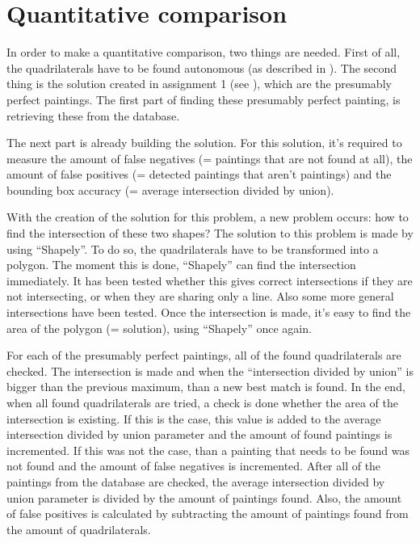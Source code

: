 

\section{Quantitative comparison}
In order to make a quantitative comparison, two things are needed. First of all, the quadrilaterals have to be found autonomous (as described in ). The second thing is the solution created in assignment 1 (see ), which are the presumably perfect paintings. The first part of finding these presumably perfect painting, is retrieving these from the database.

The next part is already building the solution. For this solution, it's required to measure the amount of false negatives (= paintings that are not found at all), the amount of false positives (= detected paintings that aren't paintings) and the bounding box accuracy (= average intersection divided by union).

With the creation of the solution for this problem, a new problem occurs: how to find the intersection of these two shapes? The solution to this problem is made by using ``Shapely''. To do so, the quadrilaterals have to be transformed into a polygon. The moment this is done, ``Shapely'' can find the intersection immediately. It has been tested whether this gives correct intersections if they are not intersecting, or when they are sharing only a line. Also some more general intersections have been tested. Once the intersection is made, it's easy to find the area of the polygon (= solution), using ``Shapely'' once again. 

For each of the presumably perfect paintings, all of the found quadrilaterals are checked. The intersection is made and when the ``intersection divided by union'' is bigger than the previous maximum, than a new best match is found. In the end, when all found quadrilaterals are tried, a check is done whether the area of the intersection is existing. If this is the case, this value is added to the average intersection divided by union parameter and the amount of found paintings is incremented. If this was not the case, than a painting that needs to be found was not found and the amount of false negatives is incremented. After all of the paintings from the database are checked, the average intersection divided by union parameter is divided by the amount of paintings found. Also, the amount of false positives is calculated by subtracting the amount of paintings found from the amount of quadrilaterals.

